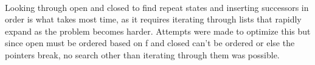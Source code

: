 \paragraph{}
Looking through open and closed to find repeat states and inserting successors in order is what takes most time, as it requires iterating through lists that rapidly expand as the problem becomes harder. Attempts were made to optimize this but since open must be ordered based on f and closed can’t be ordered or else the pointers break, no search other than iterating through them was possible.